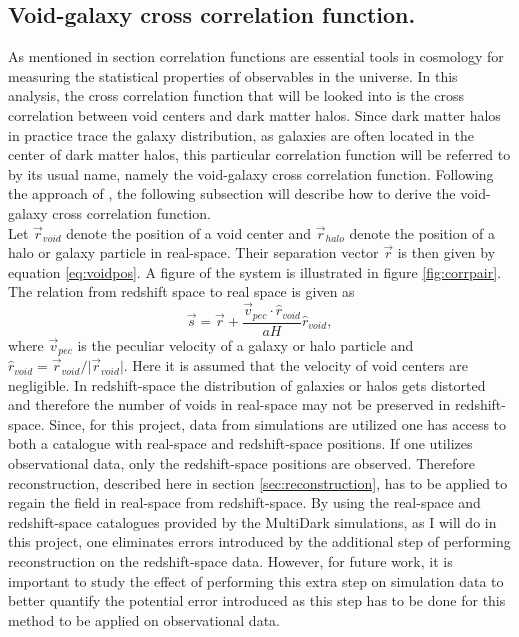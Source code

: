 \subsection{Void-galaxy cross correlation function.}\label{sec:vgcrosscorr}
As mentioned in section  correlation functions are
essential tools in cosmology for measuring the statistical properties of
observables in the universe. In this analysis, the cross correlation function that
will be looked into is the cross correlation between void centers and dark matter halos. Since dark matter halos in practice trace the galaxy distribution, as galaxies are often located in the center of dark matter halos, this particular correlation function will be referred to by its usual name, namely the void-galaxy cross correlation function. Following the approach of \cite{Nadathur_corr}, the following
subsection will describe how to derive the void-galaxy cross correlation
function. 
\\\indent
Let $\vec{r}_{void}$ denote the position of a void center and $\vec{r}_{halo}$ denote the
position of a halo or galaxy particle in real-space. Their separation vector $\vec{r}$ is then
given by equation \ref{eq:voidpos}. A figure of the system is illustrated in figure \ref{fig:corrpair}. The relation from redshift space to real space
is given as
\begin{equation}\label{eq:s_to_r}
    \vec{s}=\vec{r}+\frac{\vec{v}_{pec}\cdot\hat{r}_{void}}{aH}\hat{r}_{void},
\end{equation}
where $\vec{v}_{pec}$ is the peculiar velocity of a galaxy or halo particle and
$\hat{r}_{void}=\vec{r}_{void}/ \vert \vec{r}_{void}\vert$. Here it is assumed
that the velocity of void centers are negligible. In redshift-space the distribution of galaxies or halos gets distorted and therefore the number of voids in
real-space may not be preserved in redshift-space. Since, for this project, data from simulations are utilized one has access to both a catalogue with real-space and redshift-space positions. If one utilizes observational data, only the redshift-space positions are observed. Therefore reconstruction,
described here in section \ref{sec:reconstruction}, has to be applied to regain
the field in real-space from redshift-space. By using the real-space and redshift-space catalogues provided by the MultiDark simulations\cite{Multidark_dataset}, as I will do in this project, one eliminates errors introduced by the additional step of performing reconstruction on the redshift-space data. However, for future work, it is important to study the effect of performing this extra step on simulation data to better quantify the potential error introduced as this step has to be done for this method to be applied on observational data.\\\indent
